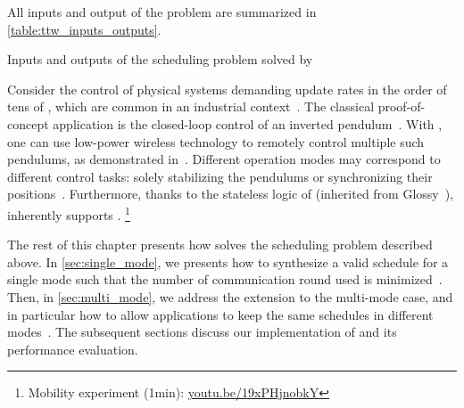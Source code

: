 All inputs and output of the problem are summarized in \cref{table:ttw_inputs_outputs}.

\begin{table}
	\caption{Inputs and outputs of the scheduling problem solved by \TTW}
	\label{table:ttw_inputs_outputs}
	\smaller{}
\end{table}

Consider the control of physical systems demanding update rates in the order of tens of \ms, which are common in an industrial context~\cite{akerberg2011Future}.
The classical proof-of-concept application is the closed-loop control of an inverted pendulum~\cite{boubaker2012inverted}.
With \TTW, one can use low-power wireless technology to remotely control multiple such pendulums, as demonstrated in~\cite{mager2019Feedback}.
Different \TTW operation modes may correspond to different control tasks: \eg solely stabilizing the pendulums or synchronizing their positions~\cite{mager2019Demo}.
Furthermore, thanks to the stateless logic of \TTnet (inherited from Glossy~\cite{ferrari2011Glossy}), \TTW inherently supports .%
%
\footnote{Mobility experiment (1min): \href{https://youtu.be/19xPHjnobkY}{youtu.be/19xPHjnobkY}}

The rest of this chapter presents how \TTW solves the scheduling problem described above.
In \cref{sec:single_mode}, we presents how to synthesize a valid schedule for a single mode such that the number of communication round used is minimized~.
Then, in \cref{sec:multi_mode}, we address the extension to the multi-mode case, and in particular how to allow applications to keep the same schedules in different modes~.
The subsequent sections discuss our implementation of \TTW and its performance evaluation.
